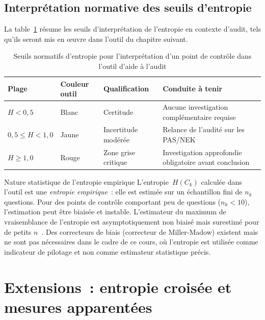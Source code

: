 \subsection{Interprétation normative des seuils d'entropie}

La table~\ref{tab:seuils} résume les seuils d'interprétation de l'entropie en
contexte d'audit, tels qu'ils seront mis en œuvre dans l'outil du chapitre
suivant.

\begin{table}[H]
\centering
\small
\caption{Seuils normatifs d'entropie pour l'interprétation d'un point de
contrôle dans l'outil d'aide à l'audit}
\label{tab:seuils}
\begin{tabular}{p{2.5cm}p{2.5cm}p{3cm}p{6cm}}
\toprule
\textbf{Plage} & \textbf{Couleur outil} & \textbf{Qualification} &
\textbf{Conduite à tenir} \\
\midrule
$H < 0{,}5$ & Blanc & Certitude & Aucune investigation complémentaire requise \\
$0{,}5 \leq H < 1{,}0$ & Jaune & Incertitude modérée &
Relance de l'audité sur les PAS/NEK \\
$H \geq 1{,}0$ & Rouge & Zone grise critique &
Investigation approfondie obligatoire avant conclusion \\
\bottomrule
\end{tabular}
\end{table}

\begin{boiteRemarque}{Nature statistique de l'entropie empirique}
L'entropie~$H(C_k)$ calculée dans l'outil est une \emph{entropie empirique}~:
elle est estimée sur un échantillon fini de $n_k$ questions. Pour des points de
contrôle comportant peu de questions ($n_k < 10$), l'estimation peut être biaisée
et instable. L'estimateur du maximum de vraisemblance de l'entropie est
asymptotiquement non biaisé mais surestimé pour de petits $n$~\cite{Paninski2003}.
Des correcteurs de biais (correcteur de Miller-Madow) existent mais ne sont pas
nécessaires dans le cadre de ce cours, où l'entropie est utilisée comme indicateur
de pilotage et non comme estimateur statistique précis.
\end{boiteRemarque}

\section{Extensions~: entropie croisée et mesures apparentées}
\label{sec:extensions}

